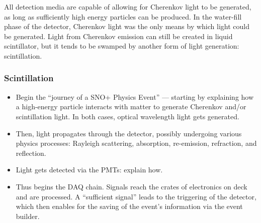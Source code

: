 All detection media are capable of allowing for Cherenkov light to be generated, as long as sufficiently high energy particles can be produced. In the water-fill phase of the detector, Cherenkov light was the only means by which light could be generated. Light from Cherenkov emission can still be created in liquid scintillator, but it tends to be swamped by another form of light generation: scintillation.
\subsubsection{Scintillation}

\begin{itemize}
    \item Begin the ``journey of a SNO+ Physics Event'' --- starting by explaining how a high-energy particle interacts with matter to generate Cherenkov and/or scintillation light. In both cases, optical wavelength light gets generated.
    \item Then, light propagates through the detector, possibly undergoing various physics processes: Rayleigh scattering, absorption, re-emission, refraction, and reflection.
    \item Light gets detected via the PMTs: explain how.
    \item Thus begins the DAQ chain. Signals reach the crates of electronics on deck and are processed. A ``sufficient signal'' leads to the triggering of the detector, which then enables for the saving of the event's information via the event builder.
\end{itemize}
